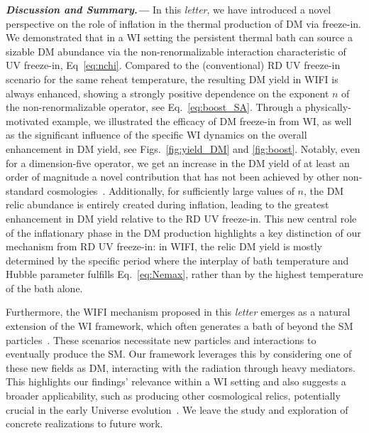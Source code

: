\documentclass[notitlepage,nofootinbib,preprintnumbers,aps,superscriptaddress,twocolumn]{revtex4-1}
\begin{document}
\textit{\textbf{Discussion and Summary.---}\label{sec:Dis}} In this \textit{letter}, we have introduced a novel perspective on the role of inflation in the thermal production of DM via freeze-in. We demonstrated that in a WI setting the persistent thermal bath can source a sizable DM abundance via the non-renormalizable interaction characteristic of UV freeze-in, Eq~\eqref{eq:nchi}. Compared to the (conventional) RD UV freeze-in scenario for the same reheat temperature, the resulting DM yield in WIFI is always enhanced,  showing a strongly positive dependence on the exponent $n$ of the non-renormalizable operator, see Eq.~\eqref{eq:boost_SA}. 
Through a physically-motivated example, we illustrated the efficacy of DM freeze-in from WI, as well as the significant influence of the specific
WI dynamics on the overall enhancement in DM yield, see Figs.~\ref{fig:yield_DM} and \ref{fig:boost}. Notably, even for a dimension-five operator, we get an increase in the DM yield of at least
an order of magnitude a novel contribution that has not been achieved by other non-standard cosmologies~\cite{Bernal:2019mhf}. Additionally, for sufficiently large values of $n$, the DM relic abundance is entirely created during inflation, leading to the greatest enhancement in DM yield relative to the RD UV freeze-in.  This new central role of the inflationary phase in the DM production highlights a key distinction of our mechanism from RD UV freeze-in: in WIFI, the relic DM yield is mostly determined by the specific period where the interplay of bath temperature and Hubble parameter fulfills Eq.~\eqref{eq:Nemax}, rather than by the highest temperature of the bath alone. 

Furthermore, the WIFI mechanism proposed in this \textit{letter} emerges as a natural extension of the WI framework, which often generates a bath of beyond the SM particles~\cite{ Berera:2008ar,Berera:2002sp, Moss:2006gt, Bastero-Gil:2016qru, Berghaus:2019whh}. These scenarios necessitate new particles and interactions to eventually produce the SM. Our framework leverages this by considering one of these new fields as DM, interacting with the radiation through heavy mediators. This  highlights our findings' relevance within a WI setting and also suggests a broader applicability, such as producing other  cosmological relics, potentially crucial in the early Universe evolution~\cite{Taylor:2000jw}. 
We leave the study and exploration of concrete realizations to future work. 
\end{document}
